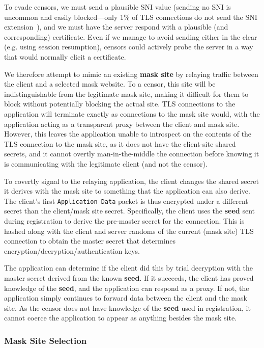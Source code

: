 \documentclass[sigconf]{acmart}
\begin{document}
To evade censors, we must send a plausible SNI value (sending no SNI is
uncommon and easily blocked---only 1\% of TLS connections
do not send the SNI extension~\cite{tls-fingerprint}), and we must have the server respond with
a plausible (and corresponding) certificate. Even if we manage to avoid sending
either in the clear (e.g. using session resumption), censors could actively probe
the server in a way that would normally elicit a certificate.


We therefore attempt to mimic an existing \textbf{mask site} by relaying
traffic between the client and a selected mask website. To a censor, this site
will be indistinguishable from the legitimate mask site, making it difficult for
them to block without potentially blocking the actual site. TLS connections to the
application will terminate exactly as connections to the mask site would, with the
application acting as a transparent proxy between the client and mask site.
However, this leaves the application unable to introspect on the contents of the
TLS connection to the mask site, as it does not have the client-site shared
secrets, and it cannot overtly man-in-the-middle the connection before knowing
it is communicating with the legitimate client (and not the censor).


To covertly signal to the relaying application, the client changes the shared secret
it derives with the
mask site to something that the application can also derive. The client's first
\texttt{Application Data} packet is thus encrypted under a different secret than
the client/mask site secret. Specifically, the client uses the \textbf{seed}
sent during registration to derive the pre-master secret for the connection.
This is hashed along with the client and server randoms of the current (mask
site) TLS connection to obtain the master secret that determines
encryption/decryption/authentication keys.

The application can determine if the client did this by trial decryption with
the master secret derived from the known \textbf{seed}. If it succeeds, the
client has proved knowledge of the \textbf{seed}, and the application can
respond as a proxy. If not, the application simply continues to forward data
between the client and the mask site. As the censor does not have knowledge of
the \textbf{seed} used in registration, it cannot coerce the application to
appear as anything besides the mask site.


\subsubsection{Mask Site Selection}
\end{document}
